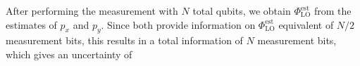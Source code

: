 After performing the measurement with $N$ total qubits, we obtain
$\Phi_\mathrm{LO}^\mathrm{est}$ from the estimates of $p_x$ and $p_y$. Since both
provide information on
$\Phi_\mathrm{LO}^\mathrm{est}$ equivalent of $N/2$ measurement bits, this results
in a total information of $N$ measurement bits, which gives an uncertainty of
